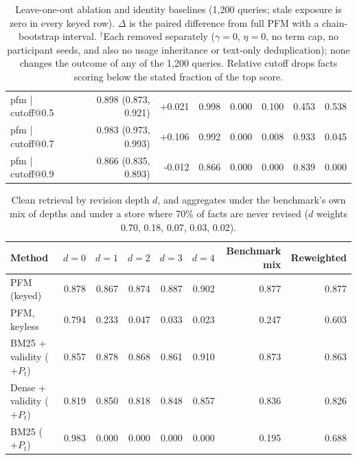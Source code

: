 \documentclass{article} %
\begin{document}
\begin{table}[h]
\begin{tabular}{@{}lrrrrrrr@{}}
pfm | cutoff@0.5 & 0.898 {\scriptsize(0.873, 0.921)} & +0.021 & 0.998 & 0.000 & 0.100 & 0.453 & 0.538 \\
pfm | cutoff@0.7 & 0.983 {\scriptsize(0.973, 0.993)} & +0.106 & 0.992 & 0.000 & 0.008 & 0.933 & 0.045 \\
pfm | cutoff@0.9 & 0.866 {\scriptsize(0.835, 0.893)} & -0.012 & 0.866 & 0.000 & 0.000 & 0.839 & 0.000 \\
\bottomrule
\end{tabular}
\caption{Leave-one-out ablation and identity baselines (1{,}200 queries; stale exposure is zero in every keyed row). $\Delta$ is the paired difference from full PFM with a chain-bootstrap interval. $^\dagger$Each removed separately ($\gamma=0$, $\eta=0$, no term cap, no participant seeds, and also no usage inheritance or text-only deduplication); none changes the outcome of any of the 1{,}200 queries. Relative cutoff drops facts scoring below the stated fraction of the top score.}
\label{tab:ablation}
\end{table}

\begin{table}[h]
\centering
\small
\begin{tabular}{@{}lrrrrrrr@{}}
\toprule
Method & $d{=}0$ & $d{=}1$ & $d{=}2$ & $d{=}3$ & $d{=}4$ & Benchmark mix & Reweighted \\
\midrule
PFM (keyed) & 0.878 & 0.867 & 0.874 & 0.887 & 0.902 & 0.877 & 0.877 \\
PFM, keyless & 0.794 & 0.233 & 0.047 & 0.033 & 0.023 & 0.247 & 0.603 \\
BM25 + validity ($+P_t$) & 0.857 & 0.878 & 0.868 & 0.861 & 0.910 & 0.873 & 0.863 \\
Dense + validity ($+P_t$) & 0.819 & 0.850 & 0.818 & 0.848 & 0.857 & 0.836 & 0.826 \\
BM25 ($+P_t$) & 0.983 & 0.000 & 0.000 & 0.000 & 0.000 & 0.195 & 0.688 \\
\bottomrule
\end{tabular}
\caption{Clean retrieval by revision depth $d$, and aggregates under the benchmark's own mix of depths and under a store where 70\% of facts are never revised ($d$ weights 0.70, 0.18, 0.07, 0.03, 0.02).}
\label{tab:depth}
\end{table}
\end{document}
